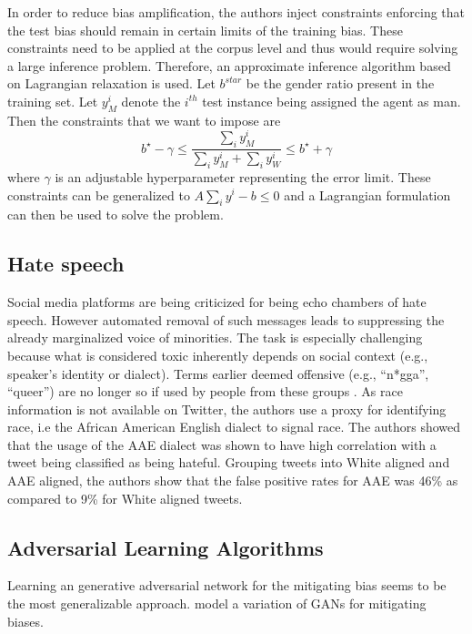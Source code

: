 \documentclass[11pt,a4paper]{article}
\begin{document}
\begin{enumerate}
    In order to reduce bias amplification, the authors inject constraints enforcing that the test bias should remain in certain limits of the training bias. These constraints need to be applied at the corpus level and thus would require solving a large inference problem. Therefore, an approximate inference algorithm based on Lagrangian relaxation is used. Let $b^{star}$ be the gender ratio present in the training set. Let $y^{i}_{M}$ denote the $i^{th}$ test instance being assigned the agent as man. Then the constraints that we want to impose are 
    \[b^{\star} - \gamma \leq \frac{\sum_{i}y^{i}_M}{\sum_{i}y^{i}_M + \sum_{i}y^{i}_W} \leq b^{\star} + \gamma\]
    where $\gamma$ is an adjustable hyperparameter representing the error limit.
    These constraints can be generalized to $A\sum_i y^i - b \leq 0$ and a Lagrangian formulation can then be used to solve the problem.
    
    \subsection{Hate speech}
    Social media platforms are being criticized for being echo chambers of hate speech. However automated removal of such messages leads to suppressing the already marginalized voice of minorities. The task is especially challenging because what is considered toxic inherently depends on social context (e.g., speaker’s identity or dialect). Terms earlier deemed offensive (e.g., “n*gga”, “queer”) are no longer so if used by people from these groups \cite{sap-etal-2019-risk}. As race information is not available on Twitter, the authors use a proxy for identifying race, i.e the African American English dialect to signal race. The authors showed that the usage of the AAE dialect was shown to have high correlation with a tweet being classified as being hateful. Grouping tweets into White aligned and AAE aligned, the authors show that the false positive rates for AAE was 46\% as compared to 9\% for White aligned tweets.
    
    \subsection{Adversarial Learning Algorithms}
    Learning an generative adversarial network for the mitigating bias seems to be the most generalizable approach. \citet{10.1145/3278721.3278779} model a variation of GANs for mitigating biases. 
    

\end{enumerate}
\end{document}
